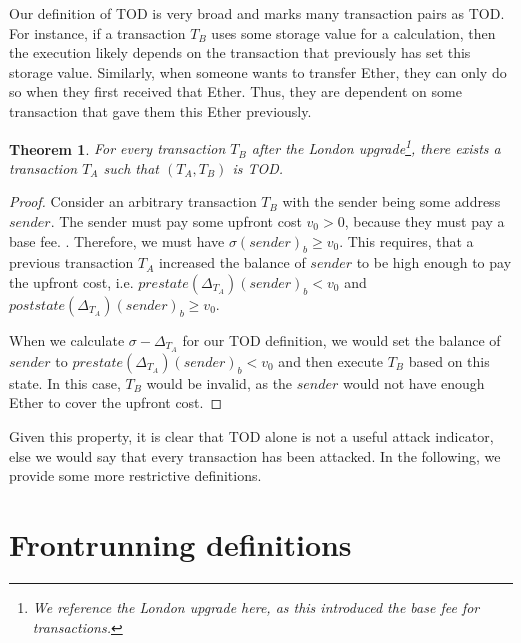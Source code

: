 \documentclass[draft,final]{vutinfth} %
\newtheorem{theorem}{Theorem}
\begin{document}
Our definition of TOD is very broad and marks many transaction pairs as TOD. For instance, if a transaction $T_B$ uses some storage value for a calculation, then the execution likely depends on the transaction that previously has set this storage value. Similarly, when someone wants to transfer Ether, they can only do so when they first received that Ether. Thus, they are dependent on some transaction that gave them this Ether previously.

\begin{theorem}
    For every transaction $T_B$ after the London upgrade\footnote{We reference the London upgrade here, as this introduced the base fee for transactions.}, there exists a transaction $T_A$ such that $(T_A, T_B)$ is TOD.
\end{theorem}

\begin{proof}
    Consider an arbitrary transaction $T_B$ with the sender being some address $sender$. The sender must pay some upfront cost $v_0 > 0$, because they must pay a base fee. \cite[p.8-9]{wood_ethereum_2024}. Therefore, we must have $\sigma(sender)_b \ge v_0$. This requires, that a previous transaction $T_A$ increased the balance of $sender$ to be high enough to pay the upfront cost, i.e. $prestate(\Delta_{T_A})(sender)_b < v_0$ and $poststate(\Delta_{T_A})(sender)_b \ge v_0$.

    When we calculate $\sigma - \Delta_{T_A}$ for our TOD definition, we would set the balance of $sender$ to $prestate(\Delta_{T_A})(sender)_b < v_0$ and then execute $T_B$ based on this state. In this case, $T_B$ would be invalid, as the $sender$ would not have enough Ether to cover the upfront cost.
\end{proof}

Given this property, it is clear that TOD alone is not a useful attack indicator, else we would say that every transaction has been attacked. In the following, we provide some more restrictive definitions.

\iffalse
    \chapter{Frontrunning definitions}

\end{document}
